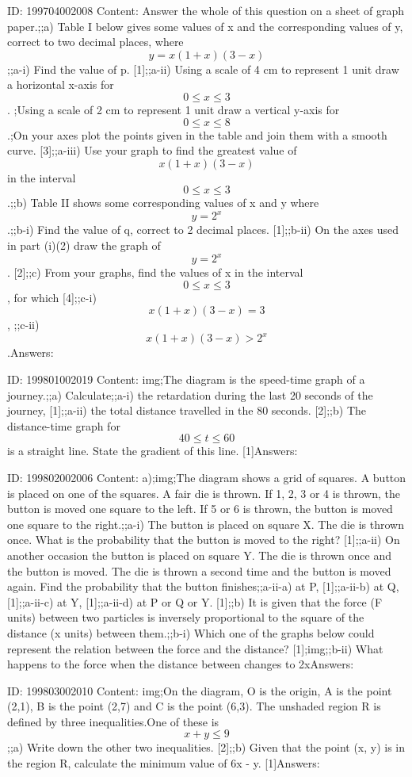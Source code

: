 \documentclass{article}
\begin{document}
ID: 199704002008
Content:
Answer the whole of this question on a sheet of graph paper.;;a) Table I below gives some values of x and the corresponding values of y, correct to two decimal places, where $$y = x(1 + x)(3 - x)$$;;a-i) Find the value of p. [1];;a-ii) Using a scale of 4 cm to represent 1 unit draw a horizontal x-axis for $$0 \leq x \leq 3$$. ;Using a scale of 2 cm to represent 1 unit draw a vertical y-axis for $$0 \leq x \leq 8$$.;On your axes plot the points given in the table and join them with a smooth curve. [3];;a-iii) Use your graph to find the greatest value of $$x(1 + x)(3 - x)$$ in the interval $$0 \leq x \leq 3$$.;;b) Table II shows some corresponding values of x and y where $$y = 2^x$$.;;b-i) Find the value of q, correct to 2 decimal places. [1];;b-ii) On the axes used in part (i)(2) draw the graph of $$y = 2^x$$. [2];;c) From your graphs, find the values of x in the interval $$0 \leq x \leq 3$$, for which [4];;c-i) $$x(1 + x)(3 - x) = 3$$, ;;c-ii) $$x(1 + x)(3 - x) > 2^x$$.Answers:

ID: 199801002019
Content:
img;The diagram is the speed-time graph of a journey.;;a) Calculate;;a-i) the retardation during the last 20 seconds of the journey, [1];;a-ii) the total distance travelled in the 80 seconds. [2];;b) The distance-time graph for $$40\leq t\leq 60$$ is a straight line. State the gradient of this line. [1]Answers:

ID: 199802002006
Content:
a);img;The diagram shows a grid of squares. A button is placed on one of the squares. A fair die is thrown. If 1, 2, 3 or 4 is thrown, the button is moved one square to the left. If 5 or 6 is thrown, the button is moved one square to the right.;;a-i) The button is placed on square X. The die is thrown once. What is the probability that the button is moved to the right? [1];;a-ii) On another occasion the button is placed on square Y. The die is thrown once and the button is moved. The die is thrown a second time and the button is moved again. Find the probability that the button finishes;;a-ii-a) at P, [1];;a-ii-b) at Q, [1];;a-ii-c) at Y, [1];;a-ii-d) at P or Q or Y. [1];;b) It is given that the force (F units) between two particles is inversely proportional to the square of the distance (x units) between them.;;b-i) Which one of the graphs below could represent the relation between the force and the distance? [1];img;;b-ii) What happens to the force when the distance between changes to 2xAnswers:

ID: 199803002010
Content:
img;On the diagram, O is the origin, A is the point (2,1), B is the point (2,7) and C is the point (6,3). The unshaded region R is defined by three inequalities.One of these is $$x + y \leq 9$$;;a) Write down the other two inequalities. [2];;b) Given that the point (x, y) is in the region R, calculate the minimum value of 6x - y. [1]Answers:
\end{document}
